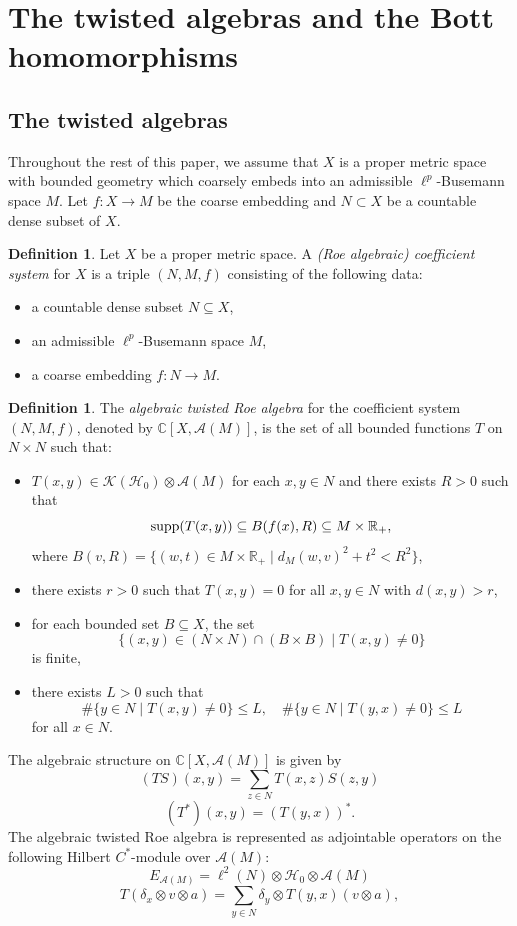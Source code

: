 \documentclass{article}
\theoremstyle{plain}
\theoremstyle{definition}
\newtheorem{definition}[theorem]{Definition}
\theoremstyle{remark}
\def\K{\mathcal K}
\def\H{\mathcal H}
\begin{document}
	\section{The twisted algebras and the Bott homomorphisms}
	\subsection{The twisted algebras}
	Throughout the rest of this paper, we assume that $X$ is a proper metric space with bounded geometry which coarsely embeds into an admissible $\ell^p$-Busemann space $M$. Let $f:X\to M$ be the coarse embedding and $N\subset X$ be a countable dense subset of $X$. 
	\begin{definition}
		Let $X$ be a proper metric space. A \emph{(Roe algebraic) coefficient system} for $X$ is a triple $(N,M,f)$ consisting of the following data:
		\begin{itemize}
			\item[(1)] a countable dense subset $N\subseteq X$,
			\item[(2)] an admissible $\ell^p$-Busemann space $M$,
			\item[(3)] a coarse embedding $f:N\to M$.
		\end{itemize}
	\end{definition}
	
	\begin{definition}\label{twistedroe}
		The \emph{algebraic twisted Roe algebra} for the coefficient system $(N,M,f)$, denoted by $\mathbb C[X,\mathcal A(M)]$, is the set of all bounded functions $T$ on $N\times N$ such that:\begin{itemize}
			\item[(1)] $T(x,y)\in\K(\H_0)\otimes\mathcal A(M)$ for each $x,y\in N$ and there exists $R>0$ such that
			$$\textup{supp}(T(x,y))\subseteq B(f(x),R)\subseteq M\times\mathbb R_+,$$
			where $B(v,R)=\{(w,t)\in M\times \mathbb{R}_{+}\mid d_{M}(w,v)^{2}+t^{2}<R^{2}\}$,
			\item[(2)] there exists $r>0$ such that $T(x,y)=0$ for all $x,y\in N$ with $d(x,y)>r$,
			\item[(3)] for each bounded set $B\subseteq X$, the set
			$$\{(x,y)\in (N\times N)\cap (B\times B)\mid T(x,y)\ne0\}$$
			is finite,
			\item[(4)] there exists $L>0$ such that
			$$\#\{y\in N\mid T(x,y)\ne0\}\leq L,\quad\#\{y\in N\mid T(y,x)\ne0\}\leq L$$
			for all $x\in N$.
	\end{itemize}\end{definition}
	The algebraic structure on $\mathbb C[X,\mathcal A(M)]$ is given by
	$$(TS)(x,y)=\sum_{z\in N}T(x,z)S(z,y)$$
	$$(T^*)(x,y)=(T(y,x))^*.$$
	The algebraic twisted Roe algebra is represented as adjointable operators on the following Hilbert $C^*$-module over $\mathcal A(M)$: $$E_{\mathcal A(M)}=\ell^2(N)\otimes\H_0\otimes\mathcal A(M)$$
	$$T(\delta_x\otimes v\otimes a)=\sum_{y\in N}\delta_y\otimes T(y,x)(v\otimes a),$$
	
\end{document}
